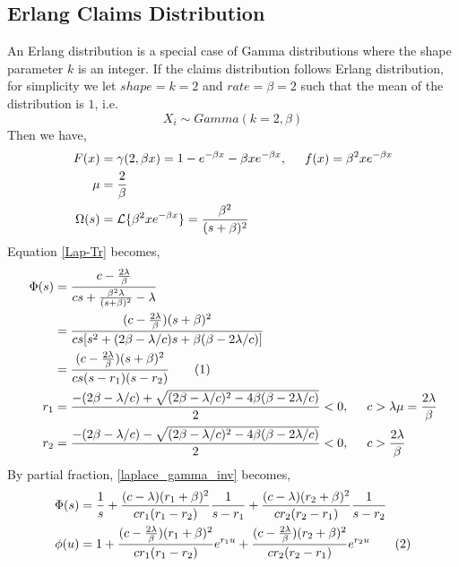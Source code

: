 \documentclass[12pt]{article}
\newcommand\numberthis{\addtocounter{equation}{1}\tag{\theequation}}
\begin{document}

\subsection{Erlang Claims Distribution}
    \hspace{5.3mm}An Erlang distribution is a special case of Gamma distributions where the shape parameter \(k\) is an integer. If the claims distribution follows Erlang distribution, for simplicity we let \(shape=k=2\) and \(rate=\beta=2\) such that the mean of the distribution is \(1\), i.e. 
    \[X_i\sim Gamma(k=2,\beta)\]
    Then we have,
    \begin{align*}
     F(x)&=\gamma(2,\beta x)=1-e^{-\beta x}-\beta xe^{-\beta x},
     \hspace{0.5cm}
     f(x)=\beta^2xe^{-\beta x}\\
     \mu&=\frac{2}{\beta}\\
     \Omega(s)&=\mathcal{L}\{\beta^2xe^{-\beta x}\}=\frac{\beta^2}{(s+\beta)^2}
    \end{align*}
    Equation \eqref{Lap-Tr} becomes,
    \begin{align*}
        \Phi(s)&=\frac{c-\frac{2\lambda}{\beta}}{cs+\frac{\beta^2\lambda}{(s+\beta)^2}-\lambda}\\
        &=\frac{(c-\frac{2\lambda}{\beta})(s+\beta)^2}{cs[s^2+(2\beta-\lambda/c)s+\beta(\beta-2\lambda/c)]}\\
        &=\frac{(c-\frac{2\lambda}{\beta})(s+\beta)^2}{cs(s-r_1)(s-r_2)}\numberthis\label{laplace_gamma_inv}\\
        r_1&=\frac{-(2\beta-\lambda/c)+\sqrt{(2\beta-\lambda/c)^2-4\beta(\beta-2\lambda/c)}}{2}<0,
        \hspace{0.5cm}
        c>\lambda\mu=\frac{2\lambda}{\beta}\\
        r_2&=\frac{-(2\beta-\lambda/c)-\sqrt{(2\beta-\lambda/c)^2-4\beta(\beta-2\lambda/c)}}{2}<0,
        \hspace{0.5cm}
        c>\frac{2\lambda}{\beta}
    \end{align*}
    By partial fraction, \eqref{laplace_gamma_inv} becomes,
    \begin{align*}
        \Phi(s)&=\frac{1}{s}+\frac{(c-\lambda)(r_1+\beta)^2}{cr_1(r_1-r_2)}\frac{1}{s-r_1}+\frac{(c-\lambda)(r_2+\beta)^2}{cr_2(r_2-r_1)}\frac{1}{s-r_2}\\
        \phi(u)&=1+\frac{(c-\frac{2\lambda}{\beta})(r_1+\beta)^2}{cr_1(r_1-r_2)}e^{r_1u}+\frac{(c-\frac{2\lambda}{\beta})(r_2+\beta)^2}{cr_2(r_2-r_1)}e^{r_2u}\numberthis\label{gamma_noinv_surv}
    \end{align*}
\end{document}
